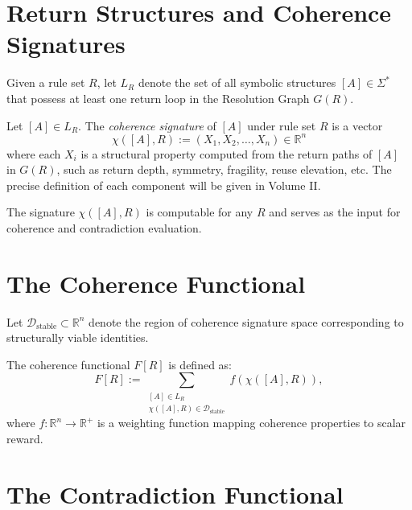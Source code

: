 \section{Return Structures and Coherence Signatures}

\begin{definition}
Given a rule set $R$, let $L_R$ denote the set of all symbolic structures $[A] \in \Sigma^*$ that possess at least one return loop in the Resolution Graph $G(R)$.
\end{definition}

\begin{definition}
Let $[A] \in L_R$. The \emph{coherence signature} of $[A]$ under rule set $R$ is a vector
\[
\chi([A], R) := (X_1, X_2, \dots, X_n) \in \mathbb{R}^n
\]
where each $X_i$ is a structural property computed from the return paths of $[A]$ in $G(R)$, such as return depth, symmetry, fragility, reuse elevation, etc. The precise definition of each component will be given in Volume II.
\end{definition}

\noindent
The signature $\chi([A], R)$ is computable for any $R$ and serves as the input for coherence and contradiction evaluation.

\section{The Coherence Functional}

\begin{definition}
Let $\mathcal{D}_{\text{stable}} \subset \mathbb{R}^n$ denote the region of coherence signature space corresponding to structurally viable identities.
\end{definition}

\begin{definition}
The coherence functional $F[R]$ is defined as:
\begin{equation}
F[R] := \sum_{\substack{[A] \in L_R \\ \chi([A], R) \in \mathcal{D}_{\text{stable}}}} f(\chi([A], R)),
\end{equation}
where $f: \mathbb{R}^n \to \mathbb{R}^+$ is a weighting function mapping coherence properties to scalar reward.
\end{definition}

\section{The Contradiction Functional}

